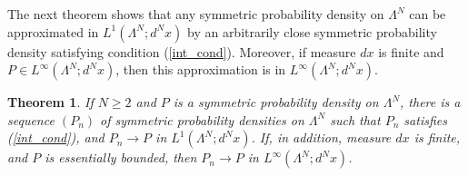 \documentclass[12pt,leqno]{amsart}
\newtheorem{theor}{Theorem}[section]{\bf}{\it}
\numberwithin{equation}{section}
\numberwithin{theor}{section}
\numberwithin{rem}{section}
\begin{document}
The next theorem shows that any symmetric probability 
density on $\Lambda^N$ can be approximated in $L^{1}(\Lambda^{N}; d^{N}x)$ by an arbitrarily close symmetric probability 
density satisfying condition (\ref{int_cond}).  Moreover, if 
measure $dx$ is finite and $P\in L^{\infty}(\Lambda^{N}; d^{N}x)$, then this approximation is in $L^{\infty}(\Lambda^{N}; d^{N}x)$.  
\begin{theor}
\label{prob_est}
If $N\geq 2$ and $P$ is a symmetric probability density on 
$\Lambda^N$, there is a sequence $(P_n)$ of 
symmetric probability densities on $\Lambda^N$ such that 
$P_n$ satisfies (\ref{int_cond}), and $P_n\rightarrow P$ in 
$L^{1}(\Lambda^N; d^{N}x)$.  If, in addition, measure $dx$ is finite, and $P$ is essentially bounded, then 
$P_n\rightarrow P$ in $L^{\infty}(\Lambda^N; d^{N}x)$.
\end{theor}
\end{document}
